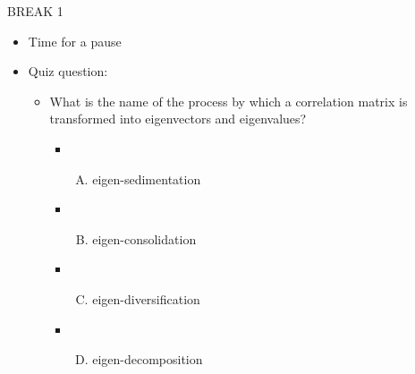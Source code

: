 \documentclass[
  ignorenonframetext,
]{beamer}
\providecommand{\tightlist}{%
  \setlength{\itemsep}{0pt}\setlength{\parskip}{0pt}}
\begin{document}
\begin{frame}{BREAK 1}
\protect\hypertarget{break-1}{}

\begin{itemize}
\tightlist
\item
  Time for a pause
\item
  Quiz question:

  \begin{itemize}
  \tightlist
  \item
    What is the name of the process by which a correlation matrix is
    transformed into eigenvectors and eigenvalues?

    \begin{itemize}
    \item
      \begin{enumerate}
      [A)]
      \tightlist
      \item
        eigen-sedimentation
      \end{enumerate}
    \item
      \begin{enumerate}
      [A)]
      \setcounter{enumi}{1}
      \tightlist
      \item
        eigen-consolidation
      \end{enumerate}
    \item
      \begin{enumerate}
      [A)]
      \setcounter{enumi}{2}
      \tightlist
      \item
        eigen-diversification
      \end{enumerate}
    \item
      \begin{enumerate}
      [A)]
      \setcounter{enumi}{3}
      \tightlist
      \item
        eigen-decomposition
      \end{enumerate}
    \end{itemize}
  \end{itemize}
\end{itemize}

\end{frame}
\end{document}
